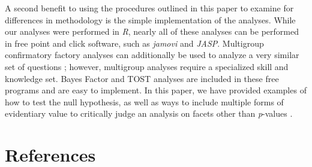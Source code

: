 \documentclass[english,man, mask]{apa6}
\theoremstyle{definition}
\theoremstyle{definition}
\theoremstyle{definition}
\theoremstyle{remark}
\begin{document}
A second benefit to using the procedures outlined in this paper to
examine for differences in methodology is the simple implementation of
the analyses. While our analyses were performed in \emph{R}, nearly all
of these analyses can be performed in free point and click software,
such as \emph{jamovi} and \emph{JASP}. Multigroup confirmatory factory
analyses can additionally be used to analyze a very similar set of
questions \autocite[covariance matrices, latent loadings, item means,
and latent means;][]{Brown2006}; however, multigroup analyses require a
specialized skill and knowledge set. Bayes Factor and TOST analyses are
included in these free programs and are easy to implement. In this
paper, we have provided examples of how to test the null hypothesis, as
well as ways to include multiple forms of evidentiary value to
critically judge an analysis on facets other than \emph{p}-values
\autocite{Valentine2017}.

\newpage

\section{References}\label{references}

\setlength{\parindent}{-0.5in} \setlength{\leftskip}{0.5in}

  \printbibliography
\end{document}

